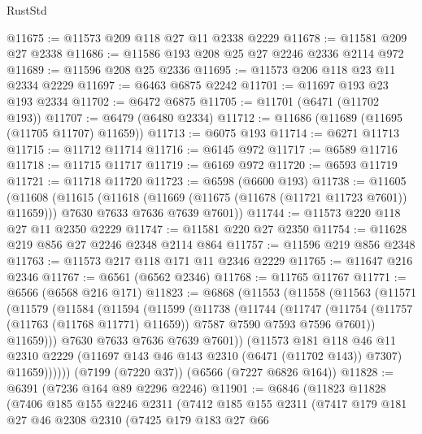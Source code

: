 \begin{lexlean}{RustStd}
\begin{coremodule}
{\begin{coremodule}
{{{{{{{{{{{{{{{{{{{{{{{{{{@11675 := @11573 @209 @118 @27 @11 @2338 @2229
@11678 := @11581 @209 @27 @2338
@11686 := @11586 @193 @208 @25 @27 @2246 @2336 @2114 @972
@11689 := @11596 @208 @25 @2336
@11695 := @11573 @206 @118 @23 @11 @2334 @2229
@11697 := @6463 @6875 @2242
@11701 := @11697 @193 @23 @193 @2334
@11702 := @6472 @6875
@11705 := @11701 (@6471 (@11702 @193))
@11707 := @6479 (@6480 @2334)
@11712 := @11686 (@11689 (@11695 (@11705 @11707) @11659))
@11713 := @6075 @193
@11714 := @6271 @11713
@11715 := @11712 @11714
@11716 := @6145 @972
@11717 := @6589 @11716
@11718 := @11715 @11717
@11719 := @6169 @972
@11720 := @6593 @11719
@11721 := @11718 @11720
@11723 := @6598 (@6600 @193)
@11738 := @11605
    (@11608
      (@11615
        (@11618 (@11669 (@11675 (@11678 (@11721 @11723 @7601)) @11659)))
        @7630
        @7633
        @7636
        @7639
        @7601))
@11744 := @11573 @220 @118 @27 @11 @2350 @2229
@11747 := @11581 @220 @27 @2350
@11754 := @11628 @219 @856 @27 @2246 @2348 @2114 @864
@11757 := @11596 @219 @856 @2348
@11763 := @11573 @217 @118 @171 @11 @2346 @2229
@11765 := @11647 @216 @2346
@11767 := @6561 (@6562 @2346)
@11768 := @11765 @11767
@11771 := @6566 (@6568 @216 @171)
@11823 := @6868
    (@11553
      (@11558
        (@11563
          (@11571
            (@11579
              (@11584
                (@11594
                  (@11599
                    (@11738
                      (@11744
                        (@11747
                          (@11754
                            (@11757 (@11763 (@11768 @11771) @11659))
                            @7587
                            @7590
                            @7593
                            @7596
                            @7601))
                        @11659)))
                  @7630
                  @7633
                  @7636
                  @7639
                  @7601))
              (@11573
                @181
                @118
                @46
                @11
                @2310
                @2229
                (@11697 @143 @46 @143 @2310 (@6471 (@11702 @143)) @7307)
                @11659))))))
    (@7199 (@7220 @37))
    (@6566 (@7227 @6826 @164))
@11828 := @6391 (@7236 @164 @89 @2296 @2246)
@11901 := @6846
    (@11823
      @11828
      (@7406
        @185
        @155
        @2246
        @2311
        (@7412
          @185
          @155
          @2311
          (@7417
            @179
            @181
            @27
            @46
            @2308
            @2310
            (@7425
              @179
              @183
              @27
              @66
}}}}}}}}}}}}}}}}}}}}}}}}}}
\end{coremodule}}
\end{coremodule}
\end{lexlean}
